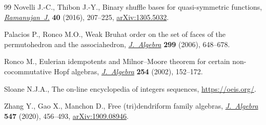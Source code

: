 \documentclass[10pt,a4paper]{amsart}
\numberwithin{equation}{section}
\theoremstyle{definition}
\theoremstyle{plain}
\begin{document}
\begin{thebibliography}{99}
Novelli J.-C., Thibon J.-Y., Binary shuffle bases for quasi-symmetric functions,
 \href{https://doi.org/10.1007/s11139-016-9777-1}{\textit{Ramanujan~J.}} \textbf{40} (2016), 207--225, \href{https://arxiv.org/abs/1305.5032}{arXiv:1305.5032}.

Palacios P., Ronco M.O., Weak {B}ruhat order on the set of faces of the
 permutohedron and the associahedron, \href{https://doi.org/10.1016/j.jalgebra.2005.09.042}{\textit{J.~Algebra}} \textbf{299} (2006),
 648--678.

Ronco M., Eulerian idempotents and {M}ilnor--{M}oore theorem for certain
 non-cocommutative {H}opf algebras, \href{https://doi.org/10.1016/S0021-8693(02)00097-2}{\textit{J.~Algebra}} \textbf{254} (2002),
 152--172.

Sloane N.J.A., The on-line encyclopedia of integers sequences,
 \url{https://oeis.org/}.

Zhang Y., Gao X., Manchon D., Free (tri)dendriform family algebras,
 \href{https://doi.org/10.1016/j.jalgebra.2019.11.027}{\textit{J.~Algebra}} \textbf{547} (2020), 456--493, \href{https://arxiv.org/abs/1909.08946}{arXiv:1909.08946}.

\end{thebibliography}
\end{document}
